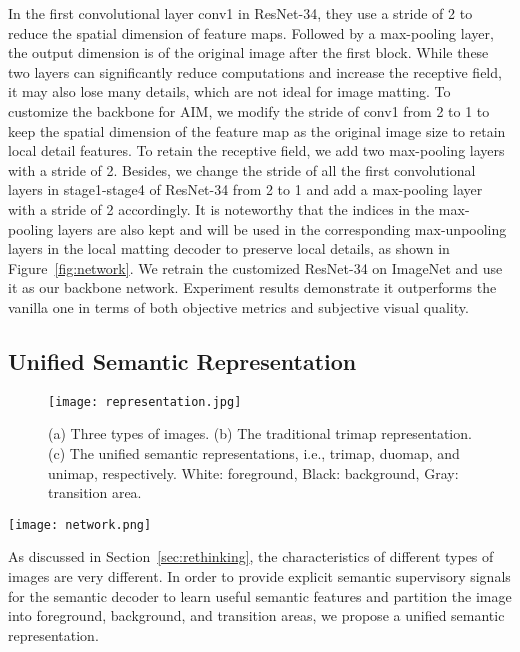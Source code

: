 \documentclass{article}
\begin{document}
In the first convolutional layer conv1 in ResNet-34, they use a stride of 2 to reduce the spatial dimension of feature maps. Followed by a max-pooling layer, the output dimension is  of the original image after the first block. While these two layers can significantly reduce computations and increase the receptive field, it may also lose many details, which are not ideal for image matting. To customize the backbone for AIM, we modify the stride of conv1 from 2 to 1 to keep the spatial dimension of the feature map as the original image size to retain local detail features. To retain the receptive field, we add two max-pooling layers with a stride of 2. Besides, we change the stride of all the first convolutional layers in stage1-stage4 of ResNet-34 from 2 to 1 and add a max-pooling layer with a stride of 2 accordingly. It is noteworthy that the indices in the max-pooling layers are also kept and will be used in the corresponding max-unpooling layers in the local matting decoder to preserve local details, as shown in Figure~\ref{fig:network}. We retrain the customized ResNet-34 on ImageNet and use it as our backbone network. Experiment results demonstrate it outperforms the vanilla one in terms of both objective metrics and subjective visual quality. 

\subsection{Unified Semantic Representation}

\begin{figure}[hbt!]
    \texttt{[image: representation.jpg]}
    \caption{(a) Three types of images. (b) The traditional trimap representation. (c) The unified semantic representations, i.e., trimap, duomap, and unimap, respectively. White: foreground, Black: background, Gray: transition area.}
    \label{fig:featuremap}
\end{figure}

\begin{figure*}[t]

    \texttt{[image: network.png]}
    \caption{The structure of our matting network for AIM.}
    \label{fig:network}
\end{figure*}
As discussed in Section~\ref{sec:rethinking}, the characteristics of different types of images are very different. In order to provide explicit semantic supervisory signals for the semantic decoder to learn useful semantic features and partition the image into foreground, background, and transition areas, we propose a unified semantic representation. 
\end{document}
